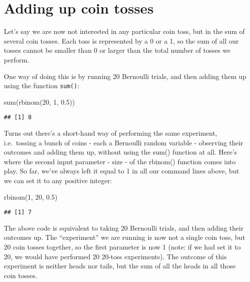\documentclass[
]{book}
\newenvironment{Shaded}{\begin{snugshade}}{\end{snugshade}}
\newcommand{\DecValTok}[1]{\textcolor[rgb]{0.00,0.00,0.81}{#1}}
\newcommand{\FloatTok}[1]{\textcolor[rgb]{0.00,0.00,0.81}{#1}}
\newcommand{\FunctionTok}[1]{\textcolor[rgb]{0.00,0.00,0.00}{#1}}
\newcommand{\NormalTok}[1]{#1}
\begin{document}
\hypertarget{adding-up-coin-tosses}{%
\section{Adding up coin tosses}\label{adding-up-coin-tosses}}

Let's say we are now not interested in any particular coin toss, but in the sum of several coin tosses. Each toss is represented by a 0 or a 1, so the sum of all our tosses cannot be smaller than 0 or larger than the total number of tosses we perform.

One way of doing this is by running 20 Bernoulli trials, and then adding them up using the function \texttt{sum()}:

\begin{Shaded}
\begin{Highlighting}[]
\FunctionTok{sum}\NormalTok{(}\FunctionTok{rbinom}\NormalTok{(}\DecValTok{20}\NormalTok{, }\DecValTok{1}\NormalTok{, }\FloatTok{0.5}\NormalTok{))}
\end{Highlighting}
\end{Shaded}

\begin{verbatim}
## [1] 8
\end{verbatim}

Turns out there's a short-hand way of performing the same experiment, i.e.~tossing a bunch of coins - each a Bernoulli random variable - observing their outcomes and adding them up, without using the sum() function at all. Here's where the second input parameter - size - of the rbinom() function comes into play. So far, we've always left it equal to 1 in all our command lines above, but we can set it to any positive integer:

\begin{Shaded}
\begin{Highlighting}[]
\FunctionTok{rbinom}\NormalTok{(}\DecValTok{1}\NormalTok{, }\DecValTok{20}\NormalTok{, }\FloatTok{0.5}\NormalTok{)}
\end{Highlighting}
\end{Shaded}

\begin{verbatim}
## [1] 7
\end{verbatim}

The above code is equivalent to taking 20 Bernoulli trials, and then adding their outcomes up. The ``experiment'' we are running is now not a single coin toss, but 20 coin tosses together, so the first parameter is now 1 (note: if we had set it to 20, we would have performed 20 20-toss experiments). The outcome of this experiment is neither heads nor tails, but the sum of all the heads in all those coin tosses.
\end{document}
